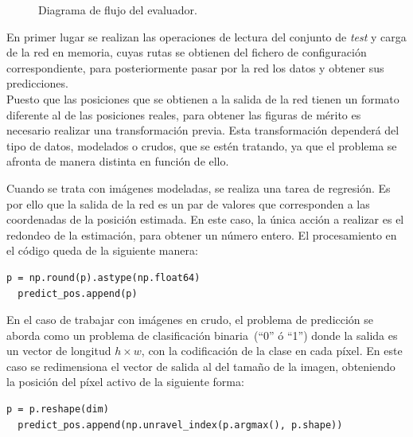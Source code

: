 \begin{figure}[H]
    \begin{center}
        \caption{Diagrama de flujo del evaluador.}
	    \label{fig.flujo_test}
	\end{center}
\end{figure}



En primer lugar se realizan las operaciones de lectura del conjunto de \textit{test} y carga de la red en memoria, cuyas rutas se obtienen del fichero de configuración correspondiente, para posteriormente pasar por la red los datos y obtener sus predicciones.\\

Puesto que las posiciones que se obtienen a la salida de la red tienen un formato diferente al de las posiciones reales, para obtener las figuras de mérito  es necesario realizar una transformación previa. Esta transformación dependerá del tipo de datos, modelados o crudos, que se estén tratando, ya que el problema se afronta de manera distinta en función de ello.

Cuando se trata con imágenes modeladas, se realiza una tarea de regresión. Es por ello que la salida de la red es un par de valores que corresponden a las coordenadas de la posición estimada. En este caso, la única acción a realizar es el redondeo de la estimación, para obtener un número entero. El procesamiento en el código queda de la siguiente manera:
\vspace{10pt}
\begin{lstlisting}[frame=single]
  p = np.round(p).astype(np.float64)
  predict_pos.append(p)
\end{lstlisting}
En el caso de trabajar con imágenes en crudo, el problema de predicción se aborda como un problema de clasificación binaria~(``0'' ó ``1'') donde la salida es un vector de longitud $h \times w$, con la codificación de la clase en cada píxel. En este caso se redimensiona el vector de salida al del tamaño de la imagen, obteniendo la posición del píxel activo de la siguiente forma:
\vspace{10pt}
\begin{lstlisting}[frame=single]
  p = p.reshape(dim)
  predict_pos.append(np.unravel_index(p.argmax(), p.shape))
\end{lstlisting}

